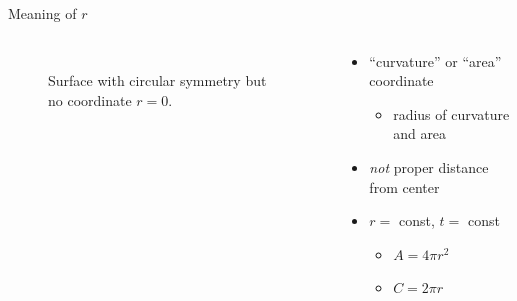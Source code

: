 \documentclass{beamer}
\let\svthefootnote\thefootnote
\newcommand\blankfootnote[1]{%
  \let\thefootnote\relax\footnotetext{#1}%
  \let\thefootnote\svthefootnote%
}
\begin{document}

\begin{frame}{Meaning of $r$}

\begin{columns}[c]
  \begin{column}{0.3\textwidth}
    \begin{figure}[ht]
      \centering
      \caption{\\Surface with circular symmetry but no coordinate $r = 0$.}
    \end{figure}
  \end{column}

  \begin{column}{0.6\textwidth}
    \begin{itemize}
    \item<+-> ``curvature'' or ``area'' coordinate
      \begin{itemize}
      \item radius of curvature and area
      \end{itemize}
    \item<+-> \emph{not} proper distance from center
    \item<+-> $r =$ const, $t =$ const
      \begin{itemize}
      \item $A = 4 \pi r^2$
      \item $C = 2 \pi r$
      \end{itemize}
    \end{itemize}
  \end{column}
\end{columns}

\blankfootnote{\textcite[p. 257]{Schutz}}

\end{frame}
\end{document}
